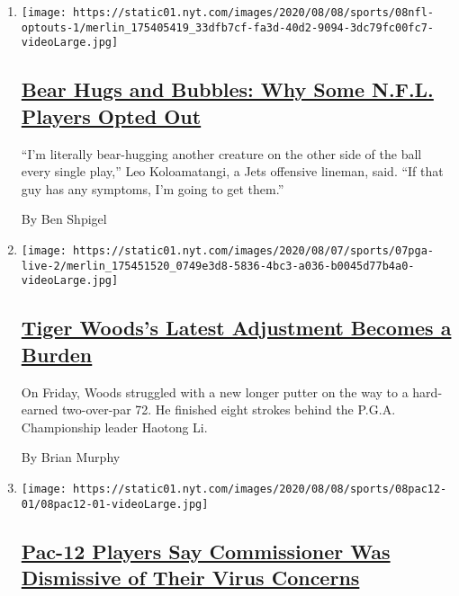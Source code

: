 \begin{enumerate}
\def\labelenumi{\arabic{enumi}.}
\item
  \texttt{[image: https://static01.nyt.com/images/2020/08/08/sports/08nfl-optouts-1/merlin\_175405419\_33dfb7cf-fa3d-40d2-9094-3dc79fc00fc7-videoLarge.jpg]}

  \hypertarget{bear-hugs-and-bubbles-why-some-nfl-players-opted-out}{%
  \subsection{\texorpdfstring{\href{/2020/08/08/sports/football/nfl-players-opt-out.html}{Bear
  Hugs and Bubbles: Why Some N.F.L. Players Opted
  Out}}{Bear Hugs and Bubbles: Why Some N.F.L. Players Opted Out}}\label{bear-hugs-and-bubbles-why-some-nfl-players-opted-out}}

  ``I'm literally bear-hugging another creature on the other side of the
  ball every single play,'' Leo Koloamatangi, a Jets offensive lineman,
  said. ``If that guy has any symptoms, I'm going to get them.''

  By Ben Shpigel
\item
  \texttt{[image: https://static01.nyt.com/images/2020/08/07/sports/07pga-live-2/merlin\_175451520\_0749e3d8-5836-4bc3-a036-b0045d77b4a0-videoLarge.jpg]}

  \hypertarget{tiger-woodss-latest-adjustment-becomes-a-burden}{%
  \subsection{\texorpdfstring{\href{/2020/08/08/sports/golf/tiger-woods-pga-championship-friday.html}{Tiger
  Woods's Latest Adjustment Becomes a
  Burden}}{Tiger Woods's Latest Adjustment Becomes a Burden}}\label{tiger-woodss-latest-adjustment-becomes-a-burden}}

  On Friday, Woods struggled with a new longer putter on the way to a
  hard-earned two-over-par 72. He finished eight strokes behind the
  P.G.A. Championship leader Haotong Li.

  By Brian Murphy
\item
  \texttt{[image: https://static01.nyt.com/images/2020/08/08/sports/08pac12-01/08pac12-01-videoLarge.jpg]}

  \hypertarget{pac-12-players-say-commissioner-was-dismissive-of-their-virus-concerns}{%
  \subsection{\texorpdfstring{\href{/2020/08/08/sports/ncaafootball/coronavirus-pac-12-players-larry-scott.html}{Pac-12
  Players Say Commissioner Was Dismissive of Their Virus
  Concerns}}{Pac-12 Players Say Commissioner Was Dismissive of Their Virus Concerns}}\label{pac-12-players-say-commissioner-was-dismissive-of-their-virus-concerns}}


\end{enumerate}
